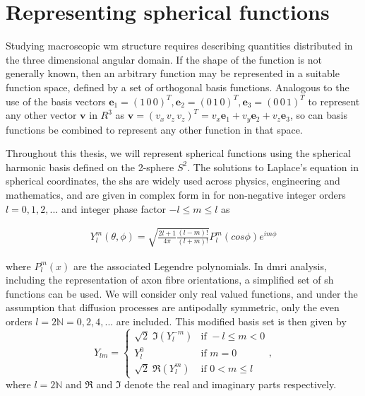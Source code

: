 \section{Representing spherical functions}
\label{sec:sh}


Studying macroscopic \gls{wm} structure requires describing quantities distributed in the three dimensional angular domain.
If the shape of the function is not generally known, then an arbitrary function may be represented in a suitable function space, defined by a set of orthogonal basis functions.
Analogous to the use of the basis vectors $\mathbf{e}_1=(1\,0\,0)^T, \mathbf{e}_2=(0\,1\,0)^T, \mathbf{e}_3=(0\,0\,1)^T$ to represent any other vector
$\mathbf{v}$ in $R^3$ as $\mathbf{v} =  (v_x\,v_z\,v_z)^T = v_x\mathbf{e}_1 + v_y\mathbf{e}_2 + v_z\mathbf{e}_3$,
so can basis functions be combined to represent any other function in that space.

Throughout this thesis, we will represent spherical functions using the spherical harmonic basis defined on the 2-sphere $S^2$.
The solutions to Laplace's equation in spherical coordinates, the \glspl{sh} are widely used across physics, engineering and mathematics, and are given in complex form in for non-negative integer orders $l = 0, 1, 2,...$ and integer phase factor $-l \leqslant m \leqslant l$ as

\begin{align}
  Y_l^m(\theta,\phi) = \sqrt{ \frac{2l+1}{4\pi} \frac{(l-m)!}{(l+m)!} } P_l^m(cos\phi)e^{im\phi}
\end{align}

where $P_l^m(x)$ are the associated Legendre polynomials.
In \gls{dmri} analysis, including the representation of axon fibre orientations, a simplified set of \gls{sh} functions can be used.
We will consider only real valued functions, and under the assumption that diffusion processes are antipodally symmetric, only the even orders $l = 2 \mathbb{N} = 0,2,4,...$ are included.\autocite{Descoteaux2006}
This modified basis set is then given by
\begin{equation}
  Y_{lm} = \begin{cases}
              \sqrt{2} \; \Im (Y_l^{-m}) & \text{if } -l \leq m < 0 \\
              Y_l^0                      & \text{if } m=0 \\
              \sqrt{2} \; \Re (Y_l^m)    & \text{if } 0 < m \leq l
           \end{cases}, \label{eq:sh}
\end{equation}
where $l = 2\mathbb{N}$ and $\Re$ and $\Im$ denote the real and imaginary parts respectively.


